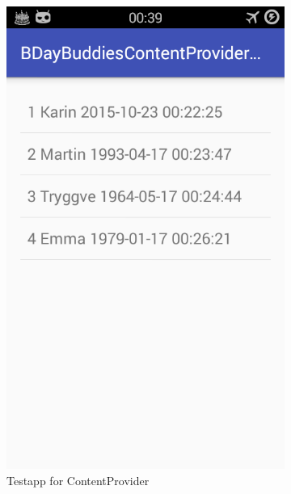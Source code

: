 \begin{figure}[ht]
    \centering
    \begin{subfigure}[b]{0.35\textwidth}
        \includegraphics[width=\textwidth]{./img/11.png}
        \caption{Testapp for ContentProvider}
        \label{fig:test_content_provider}
    \end{subfigure}
    \begin{subfigure}[b]{0.35\textwidth}

\end{subfigure}
\end{figure}
